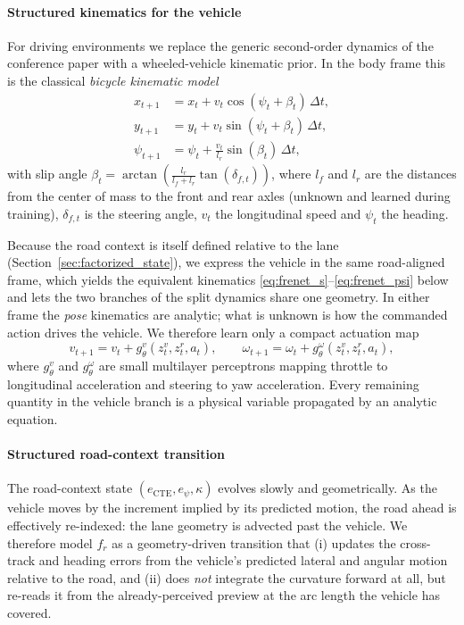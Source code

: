 \documentclass[preprint,12pt]{elsarticle}
\newcommand{\zv}{z^{v}}      %
\newcommand{\zr}{z^{r}}      %
\begin{document}
\paragraph{Structured kinematics for the vehicle}
For driving environments we replace the generic second-order dynamics of the
conference paper with a wheeled-vehicle kinematic prior.
In the body frame this is the classical \emph{bicycle kinematic model}
\begin{align}
    x_{t+1}    &= x_t    + v_t\cos(\psi_t + \beta_t)\,\Delta t,
    \label{eq:bic_x}\\
    y_{t+1}    &= y_t    + v_t\sin(\psi_t + \beta_t)\,\Delta t,
    \label{eq:bic_y}\\
    \psi_{t+1} &= \psi_t + \frac{v_t}{l_r}\sin(\beta_t)\,\Delta t,
    \label{eq:bic_psi}
\end{align}
with slip angle
$\beta_t = \arctan\!\left(\frac{l_r}{l_f + l_r}\tan(\delta_{f,t})\right)$, where
$l_f$ and $l_r$ are the distances from the center of mass to the front and rear
axles (unknown and learned during training), $\delta_{f,t}$ is the steering
angle, $v_t$ the longitudinal speed and $\psi_t$ the heading.

Because the road context is itself defined relative to the lane
(Section~\ref{sec:factorized_state}), we express the vehicle in the same
road-aligned frame, which yields the equivalent kinematics
\eqref{eq:frenet_s}--\eqref{eq:frenet_psi} below and lets the two branches of the
split dynamics share one geometry.
In either frame the \emph{pose} kinematics are analytic; what is unknown is how
the commanded action drives the vehicle.
We therefore learn only a compact actuation map
\begin{equation}
    v_{t+1} = v_t + g^v_\theta(\zv_t, \zr_t, a_t),
    \qquad
    \omega_{t+1} = \omega_t + g^\omega_\theta(\zv_t, \zr_t, a_t),
    \label{eq:actuation}
\end{equation}
where $g^v_\theta$ and $g^\omega_\theta$ are small multilayer perceptrons mapping
throttle to longitudinal acceleration and steering to yaw acceleration.
Every remaining quantity in the vehicle branch is a physical variable propagated
by an analytic equation.

\paragraph{Structured road-context transition}
The road-context state $(e_{\mathrm{CTE}}, e_\psi, \kappa)$ evolves slowly and
geometrically.
As the vehicle moves by the increment implied by its predicted motion, the road
ahead is effectively re-indexed: the lane geometry is advected past the vehicle.
We therefore model $f_r$ as a geometry-driven transition that (i) updates the
cross-track and heading errors from the vehicle's predicted lateral and angular
motion relative to the road, and (ii) does \emph{not} integrate the curvature
forward at all, but re-reads it from the already-perceived preview at the arc
length the vehicle has covered.
\end{document}
